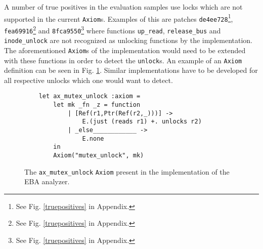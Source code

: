 \newpar A number of true positives in the evaluation samples use locks which are not supported in the current \texttt{Axiom}s. Examples of this are patches \texttt{de4ee728}\footnote{See Fig. \ref{truepositives} in Appendix.}, \texttt{fea69916}\footnote{See Fig. \ref{truepositives} in Appendix.} and \texttt{8fca9550}\footnote{See Fig. \ref{truepositives} in Appendix.} where functions \texttt{up\_read}, \texttt{release\_bus} and \texttt{inode\_unlock} are not recognized as unlocking functions by the implementation. The aforementioned \texttt{Axiom}s of the implementation would need to be extended with these functions in order to detect the \texttt{unlock}s. An example of an \texttt{Axiom} definition can be seen in Fig. \ref{axioms:mutexunlock}. Similar implementations have to be developed for all respective unlocks which one would want to detect. 

\begin{figure}[H]
    \centering
    \begin{verbatim}
    let ax_mutex_unlock :axiom =
        let mk _fn _z = function
            | [Ref(r1,Ptr(Ref(r2,_)))] ->
                E.(just (reads r1) +. unlocks r2)
            | _else____________ ->
                E.none
        in
        Axiom("mutex_unlock", mk)
    \end{verbatim}
    \caption{The \texttt{ax\_mutex\_unlock} \texttt{Axiom} present in the implementation of the EBA analyzer.}
    \label{axioms:mutexunlock}
    \end{figure}
